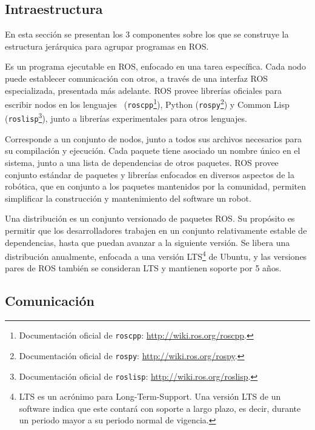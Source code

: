 \subsection{Intraestructura}

En esta sección se presentan los 3 componentes sobre los que se construye la estructura jerárquica para agrupar programas en ROS.

Es un programa ejecutable en ROS, enfocado en una tarea específica. Cada nodo puede establecer comunicación con otros, a través de una interfaz ROS especializada, presentada más adelante. ROS provee librerías oficiales para escribir nodos en los lenguajes \CC\ (\texttt{roscpp}\footnote{Documentación oficial de \texttt{roscpp}: \url{http://wiki.ros.org/roscpp}.}), Python (\texttt{rospy}\footnote{Documentación oficial de \texttt{rospy}: \url{http://wiki.ros.org/rospy}.}) y Common Lisp (\texttt{roslisp}\footnote{Documentación oficial de \texttt{roslisp}: \url{http://wiki.ros.org/roslisp}.}), junto a librerías experimentales para otros lenguajes.

Corresponde a un conjunto de nodos, junto a todos sus archivos necesarios para su compilación y ejecución. Cada paquete tiene asociado un nombre único en el sistema, junto a una lista de dependencias de otros paquetes. ROS provee conjunto estándar de paquetes y librerías enfocados en diversos aspectos de la robótica, que en conjunto a los paquetes mantenidos por la comunidad, permiten simplificar la construcción y mantenimiento del software un robot.

Una distribución es un conjunto versionado de paquetes ROS. Su propósito es permitir que los desarrolladores trabajen en un conjunto relativamente estable de dependencias, hasta que puedan avanzar a la siguiente versión. Se libera una distribución anualmente, enfocada a una versión  LTS\footnote{LTS es un acrónimo para Long-Term-Support. Una versión LTS de un software indica que este contará con soporte a largo plazo, es decir, durante un periodo mayor a su periodo normal de vigencia.} de Ubuntu, y las versiones pares de ROS también se consideran LTS y mantienen soporte por 5 años.


\subsection{Comunicación}

